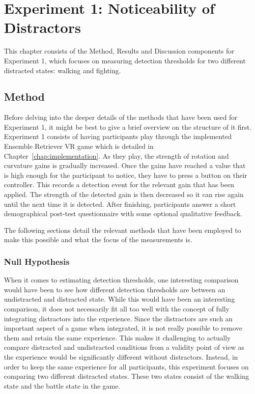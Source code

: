 \chapter{Experiment 1: Noticeability of Distractors}\label{chap:ex1}
This chapter consists of the Method, Results and Discussion components for Experiment 1, which focuses on measuring detection thresholds for two different distracted states: walking and fighting. 

\section{Method}
Before delving into the deeper details of the methods that have been used for Experiment 1, it might be best to give a brief overview on the structure of it first. Experiment 1 consists of having participants play through the implemented Ensemble Retriever VR game which is detailed in Chapter~\ref{chap:implementation}. As they play, the strength of rotation and curvature gains is gradually increased. Once the gains have reached a value that is high enough for the participant to notice, they have to press a button on their controller. This records a detection event for the relevant gain that has been applied. The strength of the detected gain is then decreased so it can rise again until the next time it is detected. After finishing, participants answer a short demographical post-test questionnaire with some optional qualitative feedback. 

The following sections detail the relevant methods that have been employed to make this possible and what the focus of the measurements is. 

\subsection{Null Hypothesis}
When it comes to estimating detection thresholds, one interesting comparison would have been to see how different detection thresholds are between an undistracted and distracted state. While this would have been an interesting comparison, it does not necessarily fit all too well with the concept of fully integrating distractors into the experience. Since the distractors are such an important aspect of a game when integrated, it is not really possible to remove them and retain the same experience. This makes it challenging to actually compare distracted and undistracted conditions from a validity point of view as the experience would be significantly different without distractors. Instead, in order to keep the same experience for all participants, this experiment focuses on comparing two different distracted states. These two states consist of the walking state and the battle state in the game. 

